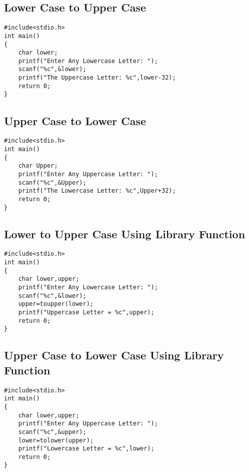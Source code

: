 \documentclass[a4paper,14pt]{article}
\begin{document}
\subsection{Lower Case to Upper Case}
\vspace{0.5cm}
\begin{lstlisting}[caption={Lower Case to Upper Case}]
#include<stdio.h>
int main()
{
    char lower;
    printf("Enter Any Lowercase Letter: ");
    scanf("%c",&lower);
    printf("The Uppercase Letter: %c",lower-32);
    return 0;
}
\end{lstlisting}
\newpage

\subsection{Upper Case to Lower Case}
\vspace{0.5cm}
\begin{lstlisting}[caption={Upper Case to Lower Case}]
#include<stdio.h>
int main()
{
    char Upper;
    printf("Enter Any Uppercase Letter: ");
    scanf("%c",&Upper);
    printf("The Lowercase Letter: %c",Upper+32);
    return 0;
}
\end{lstlisting}
\newpage

\subsection{Lower to Upper Case Using Library Function}
\vspace{0.5cm}
\begin{lstlisting}[caption={Lower to Upper Case Using Library Function}]
#include<stdio.h>
int main()
{
    char lower,upper;
    printf("Enter Any Lowercase Letter: ");
    scanf("%c",&lower);
    upper=toupper(lower);
    printf("Uppercase Letter = %c",upper);
    return 0;
}
\end{lstlisting}
\newpage

\subsection{Upper Case to Lower Case Using Library Function}
\vspace{0.5cm}
\begin{lstlisting}[caption={Upper Case to Lower Case Using Library Function}]
#include<stdio.h>
int main()
{
    char lower,upper;
    printf("Enter Any Uppercase Letter: ");
    scanf("%c",&upper);
    lower=tolower(upper);
    printf("Lowercase Letter = %c",lower);
    return 0;
}
\end{lstlisting}
\newpage
\end{document}
